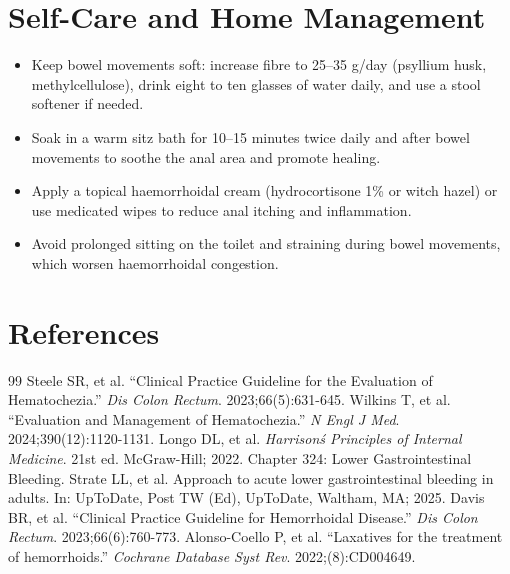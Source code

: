 \section*{Self-Care and Home Management}
\begin{itemize}
  \item Keep bowel movements soft: increase fibre to 25--35 g/day (psyllium husk, methylcellulose), drink eight to ten glasses of water daily, and use a stool softener if needed.
  \item Soak in a warm sitz bath for 10--15 minutes twice daily and after bowel movements to soothe the anal area and promote healing.
  \item Apply a topical haemorrhoidal cream (hydrocortisone 1\% or witch hazel) or use medicated wipes to reduce anal itching and inflammation.
  \item Avoid prolonged sitting on the toilet and straining during bowel movements, which worsen haemorrhoidal congestion.
\end{itemize}

\section*{References}
\begin{thebibliography}{99}
 Steele SR, et al. ``Clinical Practice Guideline for the Evaluation of Hematochezia.'' \emph{Dis Colon Rectum}. 2023;66(5):631-645.
 Wilkins T, et al. ``Evaluation and Management of Hematochezia.'' \emph{N Engl J Med}. 2024;390(12):1120-1131.
 Longo DL, et al. \emph{Harrison\'s Principles of Internal Medicine}. 21st ed. McGraw-Hill; 2022. Chapter 324: Lower Gastrointestinal Bleeding.
 Strate LL, et al. Approach to acute lower gastrointestinal bleeding in adults. In: UpToDate, Post TW (Ed), UpToDate, Waltham, MA; 2025.
 Davis BR, et al. ``Clinical Practice Guideline for Hemorrhoidal Disease.'' \emph{Dis Colon Rectum}. 2023;66(6):760-773.
 Alonso-Coello P, et al. ``Laxatives for the treatment of hemorrhoids.'' \emph{Cochrane Database Syst Rev}. 2022;(8):CD004649.
\end{thebibliography}
